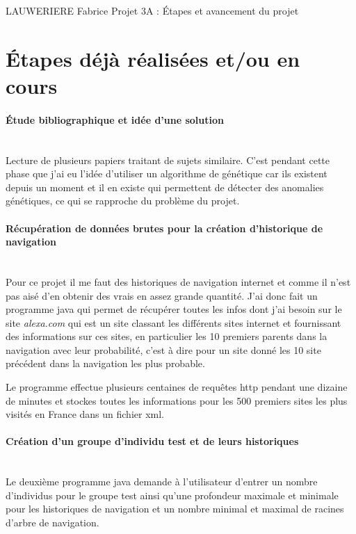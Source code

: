 \documentclass[10pt]{article}
\begin{document}
\pagestyle{empty}

\noindent LAUWERIERE Fabrice
\hspace{5.5cm}
Projet 3A : Étapes et avancement du projet

\noindent \hrulefill
\vspace{0.2cm}



\section{Étapes déjà réalisées et/ou en cours}

\paragraph{Étude bibliographique et idée d'une solution}~\\
Lecture de plusieurs papiers traitant de sujets similaire. C'est pendant cette phase que j'ai eu l'idée d'utiliser un algorithme de génétique car ils existent depuis un moment et il en existe qui permettent de détecter des anomalies génétiques, ce qui se rapproche du problème du projet.

\paragraph{Récupération de données brutes pour la création d'historique de navigation}~\\
Pour ce projet il me faut des historiques de navigation internet et comme il n'est pas aisé d'en obtenir des vrais en assez grande quantité. J'ai donc fait un programme java qui permet de récupérer toutes les infos dont j'ai besoin sur le site \emph{alexa.com} qui est un site classant les différents sites internet et fournissant des informations sur ces sites, en particulier les 10 premiers parents dans la navigation avec leur probabilité, c'est à dire pour un site donné les 10 site précédent dans la navigation les plus probable.

Le programme effectue plusieurs centaines de requêtes http pendant une dizaine de minutes et stockes toutes les informations pour les 500 premiers sites les plus visités en France dans un fichier xml.

\paragraph{Création d'un groupe d'individu test et de leurs historiques}~\\
Le deuxième programme java demande à l'utilisateur d'entrer un nombre d'individus pour le groupe test ainsi qu'une profondeur maximale et minimale pour les historiques de navigation et un nombre minimal et maximal de racines d'arbre de navigation.
\end{document}
